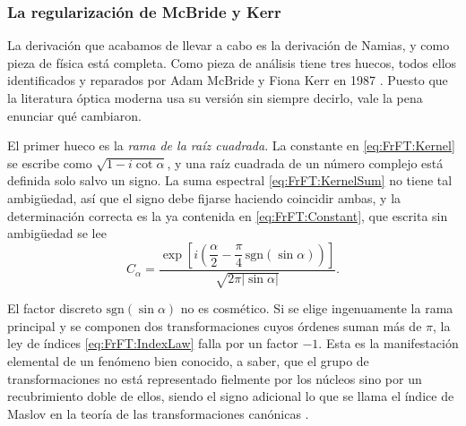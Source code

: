 		\subsubsection{La regularización de McBride y Kerr}

			La derivación que acabamos de llevar a cabo es la derivación de Namias, y como pieza de física está completa. Como pieza de análisis tiene tres huecos, todos ellos identificados y reparados por Adam McBride y Fiona Kerr en 1987 \citep{mcbride1987namias}. Puesto que la literatura óptica moderna usa su versión sin siempre decirlo, vale la pena enunciar qué cambiaron.

			El primer hueco es la \textit{rama de la raíz cuadrada}. La constante en \eqref{eq:FrFT:Kernel} se escribe como $\sqrt{1-i\cot\alpha}$, y una raíz cuadrada de un número complejo está definida solo salvo un signo. La suma espectral \eqref{eq:FrFT:KernelSum} no tiene tal ambigüedad, así que el signo debe fijarse haciendo coincidir ambas, y la determinación correcta es la ya contenida en \eqref{eq:FrFT:Constant}, que escrita sin ambigüedad se lee
			\begin{equation}\label{eq:FrFT:Branch}
				C_{\alpha} = \frac{\exp\left[i\left(\dfrac{\alpha}{2} - \dfrac{\pi}{4}\,\mathrm{sgn}\left(\sin\alpha\right)\right)\right]}{\sqrt{2\pi\left|\sin\alpha\right|}}.
			\end{equation}

			El factor discreto $\mathrm{sgn}(\sin\alpha)$ no es cosmético. Si se elige ingenuamente la rama principal y se componen dos transformaciones cuyos órdenes suman más de $\pi$, la ley de índices \eqref{eq:FrFT:IndexLaw} falla por un factor $-1$. Esta es la manifestación elemental de un fenómeno bien conocido, a saber, que el grupo de transformaciones no está representado fielmente por los núcleos sino por un recubrimiento doble de ellos, siendo el signo adicional lo que se llama el índice de Maslov en la teoría de las transformaciones canónicas \citep{moshinsky1971linear, wolf1979integral}.

